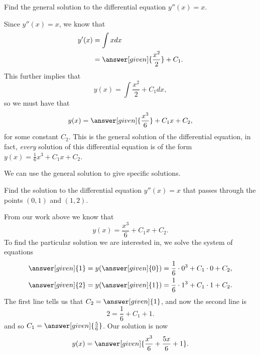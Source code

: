 \documentclass{ximera}
\begin{document}
\begin{example}
  Find the general solution to the differential equation $y''(x) = x$.
  \begin{explanation}
    Since $y''(x) = x$, we know that
    \begin{align*}
      y'(x) &= \int x dx\\
      &= \answer[given]{\frac{x^2}{2}} + C_1.
    \end{align*}
    This further implies that
    \[
    y(x) = \int \frac{x^2}{2} + C_1 dx,
    \]
    so we must have that
    \[
    y(x) = \answer[given]{\frac{x^3}{6}}+C_1x+C_2,
    \]
    for some constant $C_2$.  This is the general solution of the
    differential equation, in fact, \textit{every} solution of this
    differential equation is of the form $y(x) =
    \frac{1}{6}x^3+C_1x+C_2$.
  \end{explanation}
\end{example}

We can use the general solution to give specific solutions.

\begin{example}
  Find the solution to the differential equation $y''(x) = x$ that
  passes through the points $(0,1)$ and $(1,2)$.
  \begin{explanation}
    From our work above we know that
    \[
    y(x) = \frac{x^3}{6}+C_1x+C_2.
    \]
    To find the particular solution we are interested in, we solve the
    system of equations
    \begin{align*}
      \answer[given]{1}= y(\answer[given]{0}) &= \frac{1}{6}\cdot 0^3+C_1\cdot 0+C_2,\\
      \answer[given]{2}= y(\answer[given]{1}) &= \frac{1}{6}\cdot 1^3+C_1\cdot 1+C_2.
    \end{align*}
    The first line tells us that $C_2 = \answer[given]{1}$, and now the second line is
    \[
    2= \frac{1}{6}+C_1+1.
    \]
    and so $C_1 = \answer[given]{\frac{5}{6}}$. Our solution is now
    \[
    y(x) = \answer[given]{\frac{x^3}{6}+\frac{5 x}{6}+1}.
    \]
  \end{explanation}
\end{example}
\end{document}
